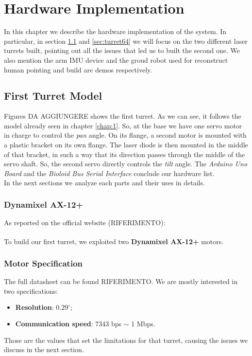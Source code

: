 \chapter{Hardware Implementation}
\label{chap:2}
In this chapter we describe the hardware implementation of the system. In particular, in section \ref{sec:turret12} and \ref{sec:turret64} we will focus on the two different laser turrets built, pointing out all the issues that led us to built the second one. We also mention the arm IMU device and the groud robot used for reconstruct human pointing and build are demos respectively.
\section{First Turret Model} \label{sec:turret12}
Figures DA AGGIUNGERE shows the first turret. As we can see, it follows the model already seen in chapter \ref{chap:1}. So, at the base we have one servo motor in charge to control the \emph{pan} angle. On its flange, a second motor is mounted with a plastic bracket on its own flange. The laser diode is then mounted in the middle of that bracket, in such a way that its direction passes through the middle of the servo shaft. So, the second servo directly controls the \emph{tilt} angle. 
The \emph{Arduino Uno Board} and the \emph{Bioloid Bus Serial Interface} conclude our hardware list.
\\In the next sections we analyze each parts and their uses in details.
\subsection{Dynamixel AX-12+}
As reported on the official website (RIFERIMENTO):\\ \\
To build our first turret, we exploited two \textbf{Dynamixel AX-12+} motors.
\subsection{Motor Specification}
The full datasheet can be found RIFERIMENTO. We are mostly interested in two specifications: 
\begin{itemize}
    \item \textbf{Resolution}: $0.29^{\circ}$;
    \item \textbf{Communication speed}: 7343 bps $\sim$ 1 Mbps.
\end{itemize}
Those are the values that set the limitations for that turret, causing the issues we discuss in the next section.
